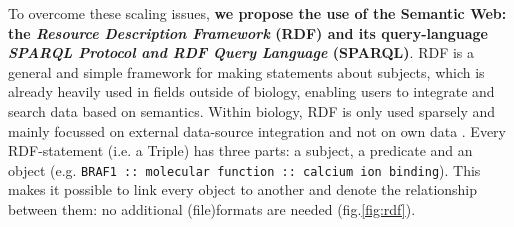 \documentclass[twoside,fontsize=10pt]{article}
\begin{document}
\noindent
To overcome these scaling issues, \textbf{we propose the use of the Semantic Web: the \textit{Resource Description Framework} (RDF) and its query-language \textit{SPARQL Protocol and RDF Query Language} (SPARQL)}. RDF is a general and simple framework for making statements about subjects, which is already heavily used in fields outside of biology, enabling users to integrate and search data based on semantics. Within biology, RDF is only used sparsely and mainly focussed on external data-source integration and not on own data \cite{Belleau2008,Neumann2006,Sahoo2008}. Every RDF-statement (i.e. a Triple) has three parts: a subject, a predicate and an object (e.g. \lstinline|BRAF1 :: molecular function :: calcium ion binding|). This makes it possible to link every object to another and denote the relationship between them: no additional (file)formats are needed (fig.\ref{fig:rdf}). 
\end{document}
